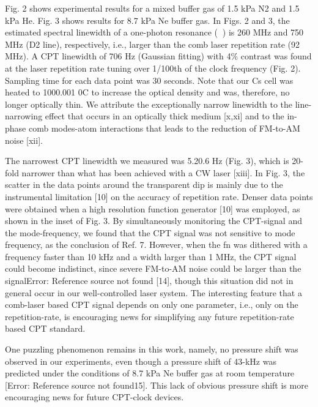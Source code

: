 \documentclass[%
reprint,  
aps,
prl,
showpacs,
preprint,
]{revtex4}
\begin{document}
Fig. 2 shows experimental results for a mixed buffer gas of 1.5 kPa N2 and 1.5 kPa He. 
Fig. 3 shows results for 8.7 kPa Ne buffer gas. In Figs. 2 and 3, the estimated 
spectral linewidth of a one-photon resonance () is 260 MHz and 750 MHz (D2 line), 
respectively, i.e., larger than the comb laser repetition rate (92 MHz). A CPT 
linewidth of 706 Hz (Gaussian fitting) with 4\% contrast was found at the laser 
repetition rate tuning over 1/100th of the clock frequency (Fig. 2). Sampling 
time for each data point was 30 seconds. Note that our Cs cell was heated to 
1000.001 0C to increase the optical density and was, therefore, no longer optically 
thin. We attribute the exceptionally narrow linewidth to the line-narrowing effect 
that occurs in an optically thick medium [x,xi] and to the in-phase comb modes-atom 
interactions that leads to the reduction of FM-to-AM noise [xii]. 

The narrowest CPT linewidth we measured was 5.20.6 Hz (Fig. 3), which is 20-fold 
narrower than what has been achieved with a CW laser [xiii]. In Fig. 3, the 
scatter in the data points around the transparent dip is mainly due to the 
instrumental limitation [10] on the accuracy of repetition rate. Denser data 
points were obtained when a high resolution function generator [10] was employed, 
as shown in the inset of Fig. 3. By simultaneously monitoring the CPT-signal and
the mode-frequency, we found that the CPT signal was not sensitive to mode frequency, 
as the conclusion of Ref. 7. However, when the fn was dithered with a frequency faster 
than 10 kHz and a width larger than 1 MHz, the CPT signal could become indistinct, 
since severe FM-to-AM noise could be larger than the signalError: Reference source 
not found [14], though this situation did not in general occur in our well-controlled 
laser system. The interesting feature that a comb-laser based CPT signal depends on
 only one parameter, i.e., only on the repetition-rate, is encouraging news for 
simplifying any future repetition-rate based CPT standard. 

One puzzling phenomenon remains in this work, namely, no pressure shift was observed 
in our experiments, even though a pressure shift of 43-kHz was predicted under the 
conditions of 8.7 kPa Ne buffer gas at room temperature [Error: Reference source not 
found15]. This lack of obvious pressure shift is more encouraging news for future 
CPT-clock devices.
\end{document}
